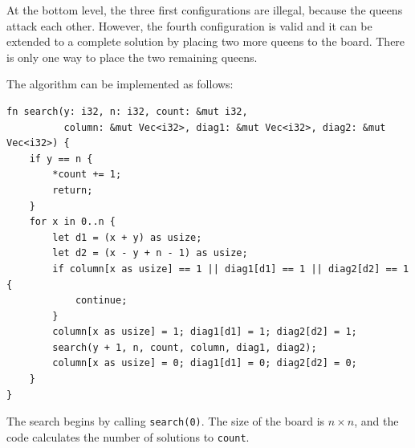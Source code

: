 \begin{center}
\end{center}

At the bottom level, the three first configurations
are illegal, because the queens attack each other.
However, the fourth configuration is valid
and it can be extended to a complete solution by
placing two more queens to the board.
There is only one way to place the two remaining queens.

\begin{samepage}
The algorithm can be implemented as follows:
\begin{lstlisting}
fn search(y: i32, n: i32, count: &mut i32,
          column: &mut Vec<i32>, diag1: &mut Vec<i32>, diag2: &mut Vec<i32>) {
    if y == n {
        *count += 1;
        return;
    }
    for x in 0..n {
        let d1 = (x + y) as usize;
        let d2 = (x - y + n - 1) as usize;
        if column[x as usize] == 1 || diag1[d1] == 1 || diag2[d2] == 1 {
            continue;
        }
        column[x as usize] = 1; diag1[d1] = 1; diag2[d2] = 1;
        search(y + 1, n, count, column, diag1, diag2);
        column[x as usize] = 0; diag1[d1] = 0; diag2[d2] = 0;
    }
}
\end{lstlisting}
\end{samepage}
The search begins by calling \texttt{search(0)}.
The size of the board is $n \times n$,
and the code calculates the number of solutions
to \texttt{count}.

